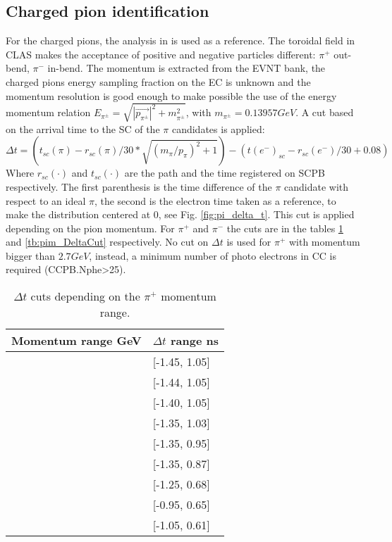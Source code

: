 \subsection{Charged pion identification}
For the charged pions, the analysis in \cite{Hayk_ana} is used as a reference. The toroidal field in CLAS makes the acceptance of positive and negative particles different: $\pi^+$ out-bend, $\pi^-$ in-bend.
The momentum is extracted from the EVNT bank, the charged pions energy sampling fraction on the EC is unknown and the momentum resolution is good enough to make possible the use of the energy momentum relation $E_{\pi^\pm} = \sqrt{|\vec{p_{\pi^\pm}}|^2 + m_{\pi^\pm}^2 }$, with $m_{\pi^\pm}=0.13957 GeV$.
A cut based on the arrival time to the SC of the $\pi$ candidates is applied:
\begin{equation}
\Delta t = \left( t_{sc}(\pi) -r_{sc}(\pi)/30*\sqrt{(m_\pi/p_{\pi})^2 +1}\right) - \left( t(e^-)_{sc} -r_{sc}(e^-)/30 + 0.08 \right)
\label{eq:pi_delta_t} 
\end{equation} 
Where $r_{sc}(\cdot)$ and $t_{sc}(\cdot)$ are the path and the time registered on SCPB respectively. The first parenthesis is the time difference of the $\pi$ candidate with respect to an ideal $\pi$, the second is the electron time taken as a reference, to make the distribution centered at 0, see Fig. \ref{fig:pi_delta_t}. This cut is applied depending on the pion momentum.
For $\pi^+$ and $\pi^-$ the cuts are in the tables \ref{tb:pip_DeltaCut} and \ref{tb:pim_DeltaCut} respectively. No cut on $\Delta t$ is used for $\pi^+$ with momentum bigger than $2.7 GeV$, instead, a minimum number of photo electrons in CC is required (CCPB.Nphe>25).
\begin{table}
\centering
\begin{tabular}{|l|l|}
\hline
Momentum range GeV & $\Delta t$ range ns\\ \hline
[0.0, 0.25] & [-1.45, 1.05]\\ \hline
[0.25, 0.75] & [-1.44, 1.05]\\ \hline
[0.75, 1.00] & [-1.40, 1.05]\\ \hline
[1.00, 1.25] & [-1.35, 1.03]\\ \hline
[1.25, 1.50] & [-1.35, 0.95]\\ \hline
[1.50, 1.75] & [-1.35, 0.87]\\ \hline
[1.75, 2.00] & [-1.25, 0.68]\\ \hline
[2.00, 2.25] & [-0.95, 0.65]\\ \hline
[2.25, 2.70] & [-1.05, 0.61]\\ \hline
\end{tabular}
\caption{$\Delta t$ cuts depending on the $\pi^+$ momentum range.}
\label{tb:pip_DeltaCut}
\end{table}
